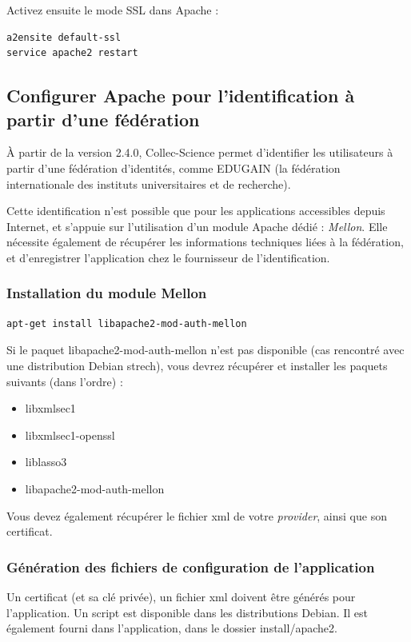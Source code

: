 Activez ensuite le mode SSL dans Apache :
\begin{lstlisting}
a2ensite default-ssl
service apache2 restart
\end{lstlisting}

\subsection{Configurer Apache pour l'identification à partir d'une fédération}
\label{mellon}
À partir de la version 2.4.0, Collec-Science permet d'identifier les utilisateurs à partir d'une fédération d'identités, comme EDUGAIN (la fédération internationale des instituts universitaires et de recherche).

Cette identification n'est possible que pour les applications accessibles depuis Internet, et s'appuie sur l'utilisation d'un module Apache dédié : \textit{Mellon}. Elle nécessite également de récupérer les informations techniques liées à la fédération, et d'enregistrer l'application chez le fournisseur de l'identification.

\subsubsection{Installation du module Mellon}
\begin{lstlisting}
apt-get install libapache2-mod-auth-mellon
\end{lstlisting}

Si le paquet libapache2-mod-auth-mellon n'est pas disponible (cas rencontré avec une distribution Debian strech), vous devrez récupérer et installer les paquets suivants (dans l'ordre) :
\begin{itemize}
	\item libxmlsec1
	\item libxmlsec1-openssl
	\item liblasso3
	\item libapache2-mod-auth-mellon
\end{itemize}

Vous devez également récupérer le fichier xml de votre \textit{provider}, ainsi que son certificat.

\subsubsection{Génération des fichiers de configuration de l'application}
Un certificat (et sa clé privée), un fichier xml doivent être générés pour l'application. Un script est disponible dans les distributions Debian. Il est également fourni dans l'application, dans le dossier install/apache2.

